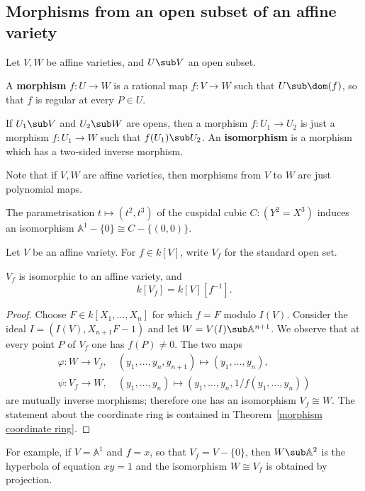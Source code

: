 \subsection{Morphisms from an open subset of an affine variety}
Let $V,W$ be affine varieties, and $U\sub V$ an open subset.
\begin{definition}
A \textbf{morphism} $f:U\to W$ is a rational map $f:V\to W$ such that $U\sub\dom(f)$, so that $f$ is regular at every $P\in U$.\par
If $U_1\sub V$ and $U_2\sub W$ are opens, then a morphism $f:U_1\to U_2$ is just a morphism $f:U_1\to W$ such that $f(U_1)\sub U_2$. An \textbf{isomorphism} is a morphism which has a two-sided inverse morphism.
\end{definition}
Note that if $V,W$ are affine varieties, then morphisms from $V$ to $W$ are just polynomial maps.
\begin{example}
The parametrisation $t\mapsto(t^2,t^3)$ of the cuspidal cubic $C:(Y^2=X^3)$ induces an isomorphism $\mathbb{A}^1-\{0\}\cong C-\{(0,0)\}$.
\end{example}
Let $V$ be an affine variety. For $f\in k[V]$, write $V_f$ for the standard open set.
\begin{proposition}
$V_f$ is isomorphic to an affine variety, and
\[k[V_f]=k[V][f^{-1}].\]
\end{proposition}
\begin{proof}
Choose $F\in k[X_1,\dots,X_n]$ for which $f=F$ modulo $I(V)$. Consider the ideal $I=(I(V),X_{n+1}F-1)$ and let $W=V(I)\sub\mathbb{A}^{n+1}$. We observe that at every point $P$ of $V_f$ one has $f(P)\neq0$. The two maps
\[\begin{array}{l}
\varphi:W\to V_f,\quad (y_1,\dots,y_n,y_{n+1})\mapsto(y_1,\dots,y_n),\\
\psi:V_f\to W,\quad (y_1,\dots,y_n)\mapsto(y_1,\dots,y_n,1/f(y_1,\dots,y_n))
\end{array}\]
are mutually inverse morphisms; therefore one has an isomorphism $V_f\cong W$. The statement about the coordinate ring is contained in Theorem~\ref{morphism coordinate ring}.
\end{proof}
For example, if $V=\mathbb{A}^1$ and $f=x$, so that $V_f=V-\{0\}$, then $W\sub\mathbb{A}^2$ is the hyperbola of equation $xy=1$ and the isomorphism $W\cong V_f$ is obtained by projection.
